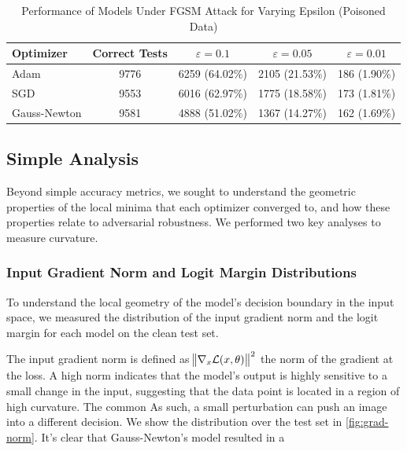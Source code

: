 \documentclass{article}
\begin{document}
    \begin{table}[ht!]
        \centering
        \caption{Performance of Models Under FGSM Attack for Varying Epsilon (Poisoned Data)}
        \label{tab:fgsm_results_poisoned}
        \begin{tabular}{|l|c|c|c|c|}
            \hline
            \textbf{Optimizer} & \textbf{Correct Tests} & $\varepsilon=0.1$ & $\varepsilon=0.05$ & $\varepsilon=0.01$ \\
            \hline
            Adam               & 9776                   & 6259 (64.02\%)    & 2105 (21.53\%)     & 186 (1.90\%)       \\
            \hline
            SGD                & 9553                   & 6016 (62.97\%)    & 1775 (18.58\%)     & 173 (1.81\%)       \\
            \hline
            Gauss-Newton       & 9581                   & 4888 (51.02\%)    & 1367 (14.27\%)     & 162 (1.69\%)       \\
            \hline
        \end{tabular}
    \end{table}

    \subsection{Simple Analysis}
    Beyond simple accuracy metrics, we sought to understand the geometric properties of the local minima that each optimizer converged to, and how these properties relate to adversarial robustness.
    We performed two key analyses to measure curvature.
    \subsubsection{Input Gradient Norm and Logit Margin Distributions}
    To understand the local geometry of the model's decision boundary in the input space, we measured the distribution of the input gradient norm and the logit margin for each model on the clean test set.

    The input gradient norm is defined as $\norm{\nabla_x \mathcal L(x, \theta)}^2$ the norm of the gradient at the loss.
    A high norm indicates that the model's output is highly sensitive to a small change in the input, suggesting that the data point is located in a region of high curvature.
    The common As such, a small perturbation can push an image into a different decision.
    We show the distribution over the test set in \cref{fig:grad-norm}.
    It's clear that Gauss-Newton's model resulted in a
\end{document}
